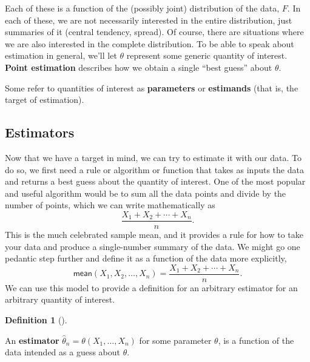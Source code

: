 \documentclass[
  letterpaper,
  DIV=11,
  numbers=noendperiod]{scrreprt}
\theoremstyle{definition}
\newtheorem{definition}{Definition}[chapter]
\theoremstyle{plain}
\theoremstyle{definition}
\theoremstyle{remark}
\begin{document}
Each of these is a function of the (possibly joint) distribution of the
data, \(F\). In each of these, we are not necessarily interested in the
entire distribution, just summaries of it (central tendency, spread). Of
course, there are situations where we are also interested in the
complete distribution. To be able to speak about estimation in general,
we'll let \(\theta\) represent some generic quantity of interest.
\textbf{Point estimation} describes how we obtain a single ``best
guess'' about \(\theta\).

\begin{tcolorbox}[enhanced jigsaw, opacitybacktitle=0.6, bottomrule=.15mm, colback=white, colframe=quarto-callout-note-color-frame, arc=.35mm, opacityback=0, breakable, leftrule=.75mm, titlerule=0mm, left=2mm, rightrule=.15mm, toptitle=1mm, bottomtitle=1mm, toprule=.15mm, title=\textcolor{quarto-callout-note-color}{\faInfo}\hspace{0.5em}{Note}, colbacktitle=quarto-callout-note-color!10!white, coltitle=black]

Some refer to quantities of interest as \textbf{parameters} or
\textbf{estimands} (that is, the target of estimation).

\end{tcolorbox}

\hypertarget{estimators}{%
\subsection{Estimators}\label{estimators}}

Now that we have a target in mind, we can try to estimate it with our
data. To do so, we first need a rule or algorithm or function that takes
as inputs the data and returns a best guess about the quantity of
interest. One of the most popular and useful algorithm would be to sum
all the data points and divide by the number of points, which we can
write mathematically as \[
\frac{X_1 + X_2 + \cdots + X_n}{n}.
\] This is the much celebrated sample mean, and it provides a rule for
how to take your data and produce a single-number summary of the data.
We might go one pedantic step further and define it as a function of the
data more explicitly, \[
\textsf{mean}(X_1, X_2, \ldots, X_n) = \frac{X_1 + X_2 + \cdots + X_n}{n}.
\] We can use this model to provide a definition for an arbitrary
estimator for an arbitrary quantity of interest.

\begin{definition}[]\protect\hypertarget{def-estimator}{}\label{def-estimator}

An \textbf{estimator} \(\widehat{\theta}_n = \theta(X_1, \ldots, X_n)\)
for some parameter \(\theta\), is a function of the data intended as a
guess about \(\theta\).

\end{definition}
\end{document}

